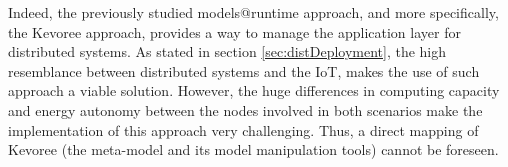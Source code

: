 Indeed, the previously studied models@runtime approach, and more specifically, the Kevoree approach, provides a way to manage the application layer for distributed systems.
As stated in section \ref{sec:distDeployment}, the high resemblance between distributed systems and the IoT, makes the use of such approach a viable solution.
However, the huge differences in computing capacity and energy autonomy between the nodes involved in both scenarios make the implementation of this approach very challenging.
Thus, a direct mapping of Kevoree (the meta-model and its model manipulation tools) cannot be foreseen.


